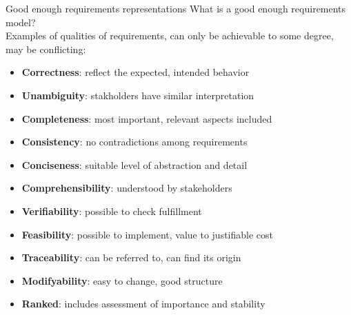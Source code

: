 \documentclass{simpleslides}
\begin{document}
\begin{frame}[fragile]{Good enough requirements representations}
What is a good enough requirements model?
\\ \vspace*{0.5em}Examples of qualities of requirements, can only be achievable to some degree, may be conflicting:
\begin{itemize}
\item \textbf{Correctness}: reflect the expected, intended behavior
\item \textbf{Unambiguity}: stakholders have similar interpretation
\item \textbf{Completeness}: most important, relevant aspects included
\item \textbf{Consistency}: no contradictions among requirements
\item \textbf{Conciseness}: suitable level of abstraction and detail 
\item \textbf{Comprehensibility}: understood by stakeholders 
\item \textbf{Verifiability}: possible to check fulfillment 
\item \textbf{Feasibility}: possible to implement, value to justifiable cost 
\item \textbf{Traceability}: can be referred to, can find its origin
\item \textbf{Modifyability}: easy to change, good structure
\item \textbf{Ranked}: includes assessment of importance and stability
\end{itemize}
\end{frame}
\end{document}
